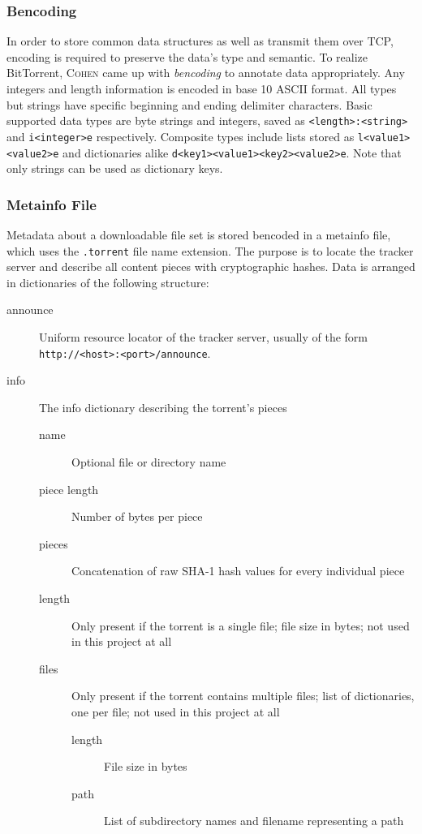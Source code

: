 \documentclass[10pt, a4paper, twoside]{scrartcl}
\renewcommand{\_}{\origunderscore\allowbreak}
\begin{document}
\subsubsection{Bencoding}
In order to store common data structures as well as transmit them over TCP, encoding is required to preserve the data's type and semantic. To realize BitTorrent, \textsc{Cohen} came up with \emph{bencoding} to annotate data appropriately. Any integers and length information is encoded in base 10 ASCII format. All types but strings have specific beginning and ending delimiter characters. Basic supported data types are byte strings and integers, saved as \texttt{<length>:<string>} and \texttt{i<integer>e} respectively. Composite types include lists stored as \texttt{l<value1><value2>e} and dictionaries alike \texttt{d<key1><value1><key2><value2>e}. Note that only strings can be used as dictionary keys.

\subsubsection{Metainfo File}
Metadata about a downloadable file set is stored bencoded in a metainfo file, which uses the \texttt{.torrent} file name extension. The purpose is to locate the tracker server and describe all content pieces with cryptographic hashes. Data is arranged in dictionaries of the following structure:

\begin{description}
  \item[announce] Uniform resource locator of the tracker server, usually of the form \nolinkurl{http://<host>:<port>/announce}.
  \item[info] The info dictionary describing the torrent's pieces
  \begin{description}
    \item[name] Optional file or directory name
    \item[piece length] Number of bytes per piece
    \item[pieces] Concatenation of raw SHA-1 hash values for every individual piece
    \item[length] Only present if the torrent is a single file; file size in bytes; not used in this project at all
    \item[files] Only present if the torrent contains multiple files; list of dictionaries, one per file; not used in this project at all
    \begin{description}
      \item[length] File size in bytes
      \item[path] List of subdirectory names and filename representing a path
    \end{description}
  \end{description}
\end{description}
\end{document}
